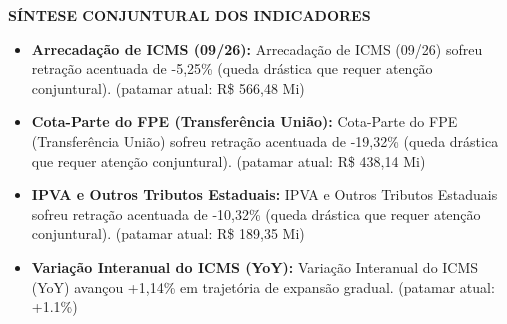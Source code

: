 \documentclass[10pt,a4paper]{article}
\begin{document}
{\begin{tikzpicture}[baseline=(box.base)]
\end{tikzpicture}\hfill%
%
}

\vspace{0.08cm}
\par\vspace{0.05cm}
\par\vspace{4pt}
{\fontsize{7.8}{9.4}\selectfont\bfseries\color{corprimaria}\MakeUppercase{Síntese Conjuntural dos Indicadores}}\par\vspace{2pt}
{\scriptsize\color{cinzatexto}
\begin{itemize}[leftmargin=10pt, itemsep=1.2pt, topsep=1pt, parsep=0pt]
   \item \textbf{\color{corprimaria}Arrecadação de ICMS (09/26):} Arrecadação de ICMS (09/26) sofreu retração acentuada de -5,25\% (queda drástica que requer atenção conjuntural). (patamar atual: R\$ 566,48 Mi)
   \item \textbf{\color{corprimaria}Cota-Parte do FPE (Transferência União):} Cota-Parte do FPE (Transferência União) sofreu retração acentuada de -19,32\% (queda drástica que requer atenção conjuntural). (patamar atual: R\$ 438,14 Mi)
   \item \textbf{\color{corprimaria}IPVA e Outros Tributos Estaduais:} IPVA e Outros Tributos Estaduais sofreu retração acentuada de -10,32\% (queda drástica que requer atenção conjuntural). (patamar atual: R\$ 189,35 Mi)
   \item \textbf{\color{corprimaria}Variação Interanual do ICMS (YoY):} Variação Interanual do ICMS (YoY) avançou +1,14\% em trajetória de expansão gradual. (patamar atual: +1.1\%)
\end{itemize}
}
\par\vspace{0.05cm}
\end{document}
